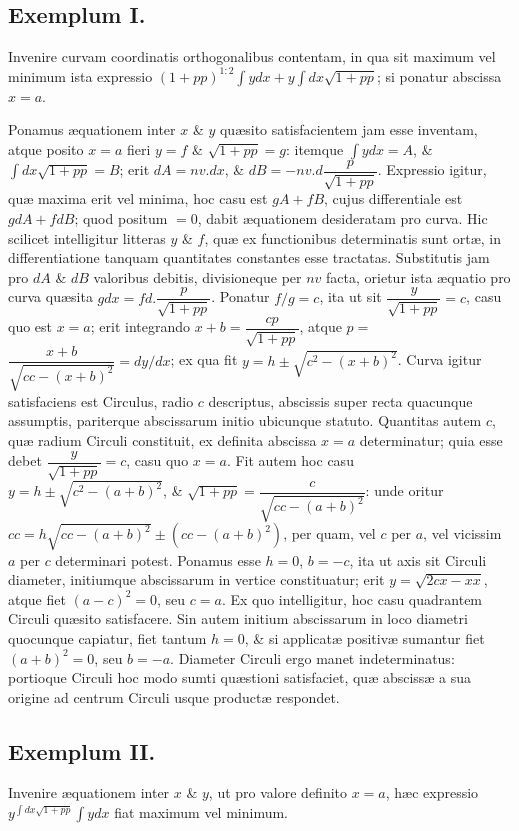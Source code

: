 \subsection*{Exemplum I.}
Invenire curvam coordinatis orthogonalibus contentam, in qua sit maximum vel minimum ista expressio $(1+pp)^{1:2}\int ydx+y\int dx\sqrt{1+pp}$; si ponatur abscissa $x=a$.

Ponamus æquationem inter $x$ \& $y$ quæsito satisfacientem jam esse inventam, atque posito $x=a$ fieri $y=f$ \& $\sqrt{1+pp}=g$: itemque $\int ydx=A$, \& $\int dx\sqrt{1+pp}=B$; erit $dA=nv.dx$, \& $dB=-nv.d\dfrac{p}{\sqrt{1+pp}}$. Expressio igitur, quæ maxima erit vel minima, hoc casu est $gA+fB$, cujus differentiale est $gdA+fdB$; quod positum $=0$, dabit æquationem desideratam pro curva. Hic scilicet intelligitur litteras $y$ \& $f$, quæ ex functionibus determinatis sunt ortæ, in differentiatione tanquam quantitates constantes esse tractatas. Substitutis jam pro $dA$ \& $dB$ valoribus debitis, divisioneque per $nv$ facta, orietur ista æquatio pro curva quæsita $gdx=fd.\dfrac{p}{\sqrt{1+pp}}$. Ponatur $f/g=c$, ita ut sit $\dfrac{y}{\sqrt{1+pp}}=c$, casu quo est $x=a$; erit integrando $x+b=\dfrac{cp}{\sqrt{1+pp}}$, atque $p=$
$\dfrac{x+b}{\sqrt{cc-(x+b)^2}}=dy/dx$; ex qua fit $y=h\pm\sqrt{c^2-(x+b)^2}$. Curva igitur satisfaciens est Circulus, radio $c$ descriptus, abscissis super recta quacunque assumptis, pariterque abscissarum initio ubicunque statuto. Quantitas autem $c$, quæ radium Circuli constituit, ex definita abscissa $x=a$ determinatur; quia esse debet $\dfrac{y}{\sqrt{1+pp}}=c$, casu quo $x=a$. Fit autem hoc casu $y=h\pm\sqrt{c^2-(a+b)^2}$, \& $\sqrt{1+pp}=\dfrac{c}{\sqrt{cc-(a+b)^2}}$: unde oritur $cc=h\sqrt{cc-(a+b)^2}\pm(cc-(a+b)^2)$, per quam, vel $c$ per $a$, vel vicissim $a$ per $c$ determinari potest. Ponamus esse $h=0$, $b=-c$, ita ut axis sit Circuli diameter, initiumque abscissarum in vertice constituatur; erit $y=\sqrt{2cx-xx}$, atque fiet $(a-c)^2=0$, seu $c=a$. Ex quo intelligitur, hoc casu quadrantem Circuli quæsito satisfacere. Sin autem initium abscissarum in loco diametri quocunque capiatur, fiet tantum $h=0$, \& si applicatæ positivæ sumantur fiet $(a+b)^2=0$, seu $b=-a$. Diameter Circuli ergo manet indeterminatus: portioque Circuli hoc modo sumti quæstioni satisfaciet, quæ abscissæ a sua origine ad centrum Circuli usque productæ respondet.
\subsection*{Exemplum II.}
Invenire æquationem inter $x$ \& $y$, ut pro valore definito $x=a$, hæc expressio $y^{\int dx\sqrt{1+pp}}\int ydx$ fiat maximum vel minimum.

